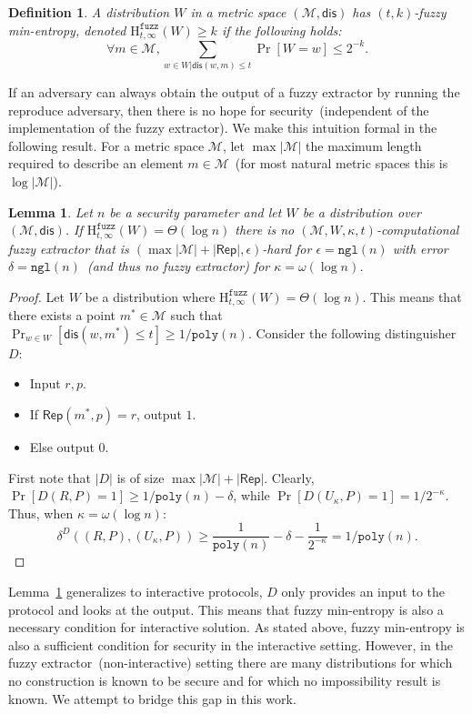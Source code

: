 \documentclass[11pt]{article}
\newcommand{\lemref}[1]{\mbox{Lemma~\ref{#1}}}
\newcommand{\class}[1]{{\ensuremath{\mathsf{#1}}}}
\newcommand{\rep}{\ensuremath{\class{Rep}}\xspace}
\newcommand{\dis}{\ensuremath{\mathsf{dis}}}
\newcommand{\poly}{\ensuremath{\mathtt{poly}}\xspace}
\newcommand{\ngl}{\ensuremath{\mathtt{ngl}}\xspace}
\newcommand{\Hfuzz}{\mathrm{H}^{\mathtt{fuzz}}_{t,\infty}}
\newtheorem{lemma}[theorem]{Lemma}
\newtheorem{definition}[theorem]{Definition}
\begin{document}

\begin{definition}
\label{def:fuzzy min-ent}
A distribution $W$ in a metric space $(\mathcal{M}, \dis)$ has $(t, k)$-fuzzy min-entropy, denoted $\Hfuzz(W) \ge k$ if the following holds:
\[
\forall m\in \mathcal{M},  \sum_{w\in W | \dis(w, m)\le t} \Pr[W=w] \leq 2^{-k}.
\]
\end{definition}

If an adversary can always obtain the output of a fuzzy extractor by running the reproduce adversary, then there is no hope for security~(independent of the implementation of the fuzzy extractor).  We make this intuition formal in the following result.  
For a metric space $\mathcal{M}$, let $\max |\mathcal{M}|$ the maximum length required to describe an element $m\in\mathcal{M}$~(for most natural metric spaces this is $\log |\mathcal{M}|$).
\begin{lemma}
\label{lem:fuzz necessary}
Let $n$ be a security parameter and let $W$ be a distribution over $(\mathcal{M}, \dis)$.
If $\Hfuzz (W) = \Theta(\log n)$ there is no $(\mathcal{M}, W, \kappa, t)$-computational fuzzy extractor that is $(\max |\mathcal{M}| +  |\rep|, \epsilon)$-hard for $\epsilon = \ngl(n)$ with error $\delta = \ngl(n)$~(and thus no fuzzy extractor) for $\kappa =\omega(\log n)$.
\end{lemma}
\begin{proof}
Let $W$ be a distribution where $\Hfuzz(W) = \Theta(\log n)$.  This means that there exists a point $m^*\in \mathcal{M}$ such that $\Pr_{w\in W}[\dis (w, m^*)\leq t] \geq 1/\poly(n)$.  Consider the following distinguisher $D$:
\begin{itemize}
\item Input $r, p$.
\item If $\rep(m^*, p) = r$, output $1$.
\item Else output $0$.
\end{itemize}
First note that $|D|$ is of size $\max |\mathcal{M}|+ |\rep|$.  Clearly, $\Pr[D(R, P) = 1]\geq 1/\poly(n) - \delta$, while $\Pr[D(U_\kappa, P)=1 ]= 1/2^{-\kappa}$.  Thus, when $\kappa = \omega(\log n)$:
\[
\delta^D((R, P), (U_\kappa, P))\geq \frac{1}{\poly(n)} -\delta -  \frac{1}{2^{-\kappa}} = 1/\poly(n).
\]
\end{proof}
\lemref{lem:fuzz necessary} generalizes to interactive protocols, $D$ only provides an input to the protocol and looks at the output.  This means that fuzzy min-entropy is also a necessary condition for interactive solution.  As stated above, fuzzy min-entropy is also a sufficient condition for security in the interactive setting.  However, in the fuzzy extractor~(non-interactive) setting there are many distributions for which no construction is known to be secure and for which no impossibility result is known.  We attempt to bridge this gap in this work.  
\end{document}
